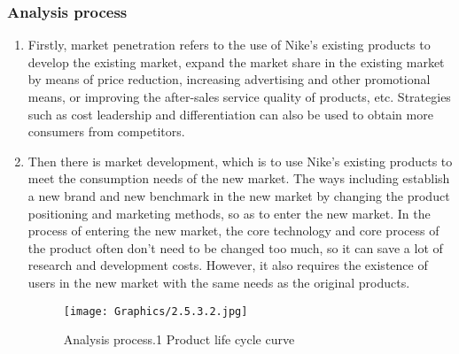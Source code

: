 \documentclass[a4paper, 12pt]{report}
\begin{document}
\subsubsection{Analysis process}
\begin{enumerate}
\item {Firstly, market penetration refers to the use of Nike's existing products to develop the existing market, expand the market share in the existing market by means of price reduction, increasing advertising and other promotional means, or improving the after-sales service quality of products, etc. Strategies such as cost leadership and differentiation can also be used to obtain more consumers from competitors.}
\item {Then there is market development, which is to use Nike's existing products to meet the consumption needs of the new market. The ways including establish a new brand and new benchmark in the new market by changing the product positioning and marketing methods, so as to enter the new market. In the process of entering the new market, the core technology and core process of the product often don't need to be changed too much, so it can save a lot of research and development costs. However, it also requires the existence of users in the new market with the same needs as the original products.\par
\begin{figure}[ht]
 			\begin{center}
			\texttt{[image: Graphics/2.5.3.2.jpg]}
			\end{center}
       		\caption{\label{2.5.3.2}Analysis process.1  Product life cycle curve}
 \end{figure}
}
\end{enumerate}
\end{document}
